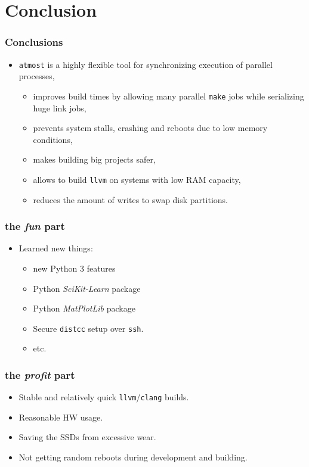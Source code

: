 \documentclass[compress,table,xcolor=table]{beamer}
\newcommand{\shelltext}[1]{\texttt{\colorbox{light-gray}{#1}}}
\begin{document}
\section{Conclusion}
\begin{frame}
  \frametitle{Conclusions}
  \begin{itemize}
    \Large
    \item \shelltext{atmost} is a highly flexible tool for synchronizing
      execution of parallel processes,
    \begin{itemize}
    \large
    \item improves build times by allowing many
      parallel \shelltext{make} jobs while serializing huge link jobs,
    \item prevents system stalls, crashing and reboots due to low memory conditions,
    \item makes building big projects safer,
    \item allows to build \shelltext{llvm} on systems with low RAM capacity,
    \item reduces the amount of writes to swap disk partitions.
    \end{itemize}
  \end{itemize}
\end{frame}
\begin{frame}
  \frametitle{the {\em \Huge fun} part}
  \begin{itemize}
    \LARGE
    \item Learned new things:
    \Large
    \begin{itemize}
      \item new Python 3 features
      \item Python {\em SciKit-Learn} package
      \item Python {\em MatPlotLib} package
      \item Secure \shelltext{distcc} setup over \shelltext{ssh}.
      \item etc.
    \end{itemize}
  \end{itemize}
\end{frame}
\begin{frame}
  \frametitle{the {\em \Huge profit} part}
  \begin{itemize}
    \LARGE
    \item Stable and relatively quick \shelltext{llvm}/\shelltext{clang} builds.
    \item Reasonable HW usage.
    \item Saving the SSDs from excessive wear.
    \item Not getting random reboots during development and building.
  \end{itemize}
\end{frame}
\end{document}
